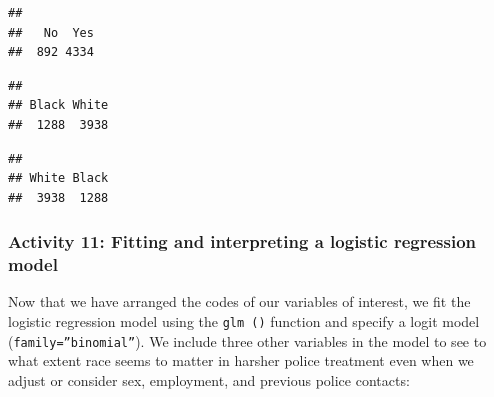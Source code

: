 \documentclass[
]{book}
\newenvironment{Shaded}{\begin{snugshade}}{\end{snugshade}}
\newcommand{\CommentTok}[1]{\textcolor[rgb]{0.56,0.35,0.01}{\textit{#1}}}
\newcommand{\FunctionTok}[1]{\textcolor[rgb]{0.00,0.00,0.00}{#1}}
\newcommand{\NormalTok}[1]{#1}
\newcommand{\OtherTok}[1]{\textcolor[rgb]{0.56,0.35,0.01}{#1}}
\newcommand{\SpecialCharTok}[1]{\textcolor[rgb]{0.00,0.00,0.00}{#1}}
\newcommand{\StringTok}[1]{\textcolor[rgb]{0.31,0.60,0.02}{#1}}
\begin{document}
\begin{verbatim}
## 
##   No  Yes 
##  892 4334
\end{verbatim}

\begin{Shaded}
\end{Shaded}

\begin{verbatim}
## 
## Black White 
##  1288  3938
\end{verbatim}

\begin{Shaded}
\end{Shaded}

\begin{verbatim}
## 
## White Black 
##  3938  1288
\end{verbatim}

\hypertarget{activity-11-fitting-and-interpreting-a-logistic-regression-model}{%
\subsubsection{Activity 11: Fitting and interpreting a logistic regression model}\label{activity-11-fitting-and-interpreting-a-logistic-regression-model}}

Now that we have arranged the codes of our variables of interest, we fit the logistic regression model using the \texttt{glm\ ()} function and specify a logit model (\texttt{family=”binomial”}). We include three other variables in the model to see to what extent race seems to matter in harsher police treatment even when we adjust or consider sex, employment, and previous police contacts:
\end{document}
